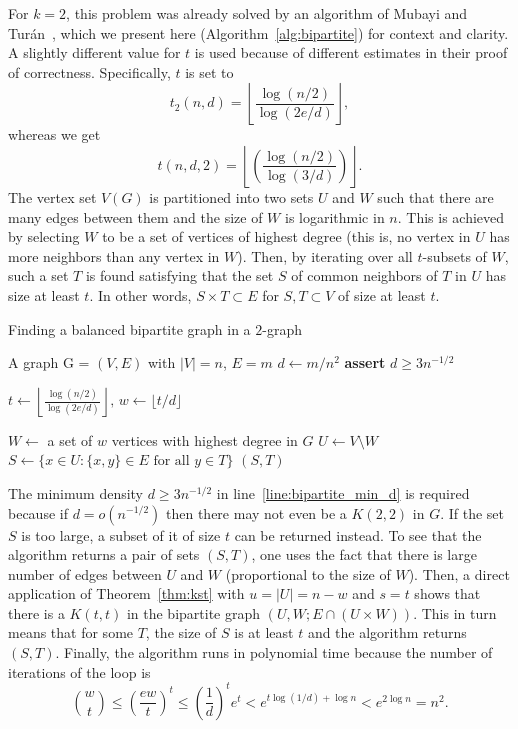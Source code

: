 
For $k = 2$, this problem was already solved by an algorithm of Mubayi and Turán~\cite{MUBAYI2010174},
which we present here (Algorithm~\ref{alg:bipartite}) for context and clarity.
A slightly different value for $t$ is used because of different estimates in their proof of correctness.
Specifically, $t$ is set to
\[
    t_2(n, d) = \left\lfloor \frac{\log (n/2) }{\log (2e/d)}\right\rfloor,
\]
whereas we get
\[
    t(n, d, 2) = \left\lfloor
        \left(  \frac{\log (n/2)}{\log (3/d)} \right)
       \right\rfloor.
\]
The vertex set $V(G)$ is partitioned into two sets $U$ and $W$ such that there are many edges between them
and the size of $W$ is logarithmic in $n$.
This is achieved by selecting $W$ to be a set of vertices of highest degree
(this is, no vertex in $U$ has more neighbors than any vertex in $W$).
Then, by iterating over all $t$-subsets of $W$, such a set $T$
is found satisfying that the set $S$ of common neighbors of $T$ in $U$ has size at least $t$.
In other words, $S \times T \subset E$ for $S, T \subset V$ of size at least $t$.

\begin{algorithm}
    \caption{Finding a balanced bipartite graph in a $2$-graph}
    \label{alg:bipartite}
        \begin{algorithmic}[1]
        \Require A graph G = $(V, E)$ with $|V| = n$, $E = m$
        \State $d \gets m / n^2 $
        \State \textbf{assert} $d \geq 3 n^{-1/2}$ \label{line:bipartite_min_d}

        \State $t \gets \left\lfloor\frac{\log (n/2) }
        {\log (2e/d)}\right\rfloor,\, w \gets \lfloor t/d \rfloor$

        \State $W \gets $ a set of $w$ vertices with highest degree in $G$
        \State $U \gets V \setminus W$
         \label{line:2partite_for}
            \State $S \gets \{x \in U \colon \{x, y\} \in E \text{ for all } y \in T\}$
                \State \Return $(S, T)$
            \EndIf
        \EndFor
        \end{algorithmic}
\end{algorithm}

The minimum density $d \geq 3n^{-1/2}$ in line~\ref{line:bipartite_min_d} is required
because if $d = o\left(n^{-1/2}\right)$ then
there may not even be a $K(2, 2)$ in $G$. %
If the set $S$ is too large, a subset of it of size $t$ can be returned instead.
To see that the algorithm returns a pair of sets $(S, T)$, one uses the fact that
there is large number of edges between $U$ and $W$ (proportional to the size of $W$).
Then, a direct application of Theorem~\ref{thm:kst}
with $u = |U| = n - w$ and $s = t$ shows that
there is a $K(t, t)$ in the bipartite graph $(U, W; E \cap (U \times W))$.
This in turn means that for some $T$,
the size of $S$ is at least $t$
and the algorithm returns $(S, T)$.
Finally, the algorithm runs in polynomial time because 
the  number of iterations of the loop is
\[
    \binom{w}{t} \leq
    \left(\frac{ew}{t}\right)^t \leq
    \left(\frac{1}{d}\right)^t e^t < e^{t \log (1/d) + \log n} <
    e^{2\log n} = n^2.
\]

